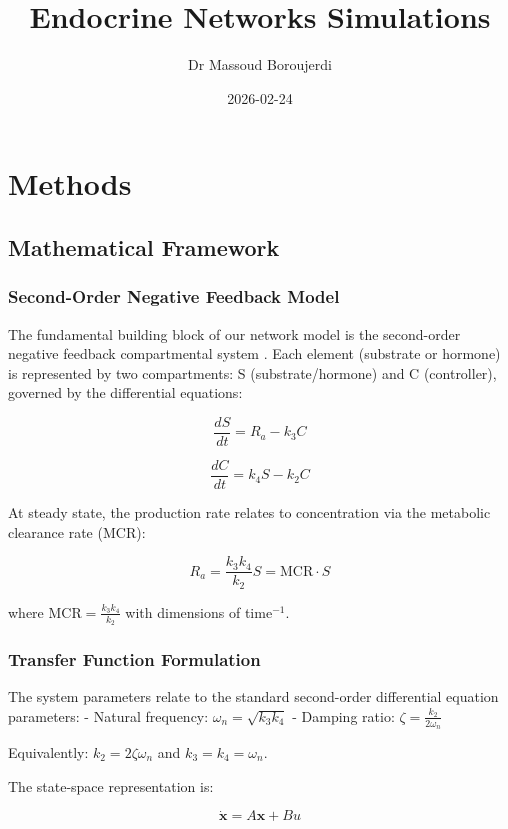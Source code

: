 \documentclass[
]{book}
\title{Endocrine Networks Simulations}
\author{Dr Massoud Boroujerdi}
\date{2026-02-24}
\begin{document}
\maketitle

\chapter{Methods}\label{Methods}

\section{Mathematical Framework}\label{mathematical-framework}

\subsection{Second-Order Negative Feedback Model}\label{second-order-negative-feedback-model}

The fundamental building block of our network model is the second-order negative feedback compartmental system \citep{Boroujerdi2013, Boroujerdi2024}. Each element (substrate or hormone) is represented by two compartments: S (substrate/hormone) and C (controller), governed by the differential equations:

\[\frac{dS}{dt} = R_a - k_3C\]

\[\frac{dC}{dt} = k_4S - k_2C\]

At steady state, the production rate relates to concentration via the metabolic clearance rate (MCR):

\[R_a = \frac{k_3k_4}{k_2}S = \text{MCR} \cdot S\]

where \(\text{MCR} = \frac{k_3k_4}{k_2}\) with dimensions of time\(^{-1}\).

\subsection{Transfer Function Formulation}\label{transfer-function-formulation}

The system parameters relate to the standard second-order differential equation parameters:
- Natural frequency: \(\omega_n = \sqrt{k_3k_4}\)
- Damping ratio: \(\zeta = \frac{k_2}{2\omega_n}\)

Equivalently: \(k_2 = 2\zeta\omega_n\) and \(k_3 = k_4 = \omega_n\).

The state-space representation is:

\[\dot{\mathbf{x}} = A\mathbf{x} + Bu\]
\end{document}
